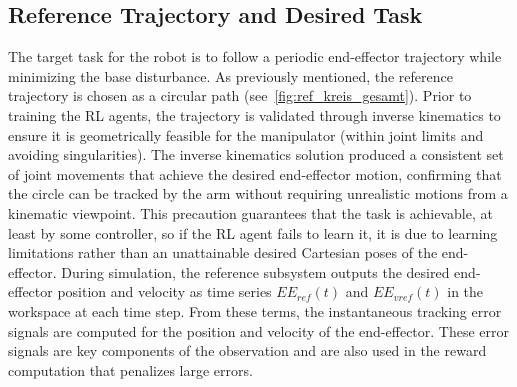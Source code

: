 \documentclass{ieeeaccess}
\begin{document}
\subsection{Reference Trajectory and Desired Task} The target task for the robot is to follow a periodic end-effector
trajectory while minimizing the base disturbance. As previously mentioned, the reference trajectory is chosen as a circular
path (see~\autoref{fig:ref_kreis_gesamt}). Prior to training the RL agents, the trajectory is validated through inverse kinematics to ensure it is
geometrically feasible for the manipulator (within joint limits and avoiding singularities). The inverse
kinematics solution produced a consistent set of joint movements that achieve the desired end-effector
motion, confirming that the circle can be tracked by the arm without requiring unrealistic motions from a kinematic viewpoint.
This precaution guarantees that the task is achievable, at least by some controller, so if the RL agent
fails to learn it, it is due to learning limitations rather than an unattainable desired Cartesian poses of the end-effector.  During simulation, the reference subsystem outputs  the desired end-effector position and velocity
as time series $EE_{ref}(t)$ and $EE_{vref}(t)$ in the workspace at each time step. From
these terms, the instantaneous tracking error signals are computed for the position and velocity of the end-effector. These error signals  are key components of the observation and are also
used in the reward computation that penalizes large errors.%

\end{document}
